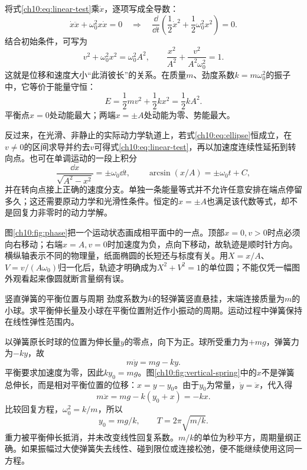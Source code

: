 将式\eqref{ch10:eq:linear-test}乘$\dot x$，逐项写成全导数：
\[
 \dot x\ddot x+\omega_0^2x\dot x=0
 \quad\Longrightarrow\quad
 \frac{\dd}{\dd t}\left(\frac12\dot x^2+\frac12\omega_0^2x^2\right)=0.
\]
结合初始条件，可写为
\begin{equation}\label{ch10:eq:ellipse}
 v^2+\omega_0^2x^2=\omega_0^2A^2,
 \qquad \frac{x^2}{A^2}+\frac{v^2}{A^2\omega_0^2}=1.
\end{equation}
这就是位移和速度大小“此消彼长”的关系。在质量$m$、劲度系数$k=m\omega_0^2$的振子中，它等价于能量守恒：
\begin{equation}\label{ch10:eq:energy}
 E=\frac12mv^2+\frac12kx^2=\frac12kA^2.
\end{equation}
平衡点$x=0$处动能最大；两端$x=\pm A$处动能为零、势能最大。

反过来，在光滑、非静止的实际动力学轨道上，若式\eqref{ch10:eq:ellipse}恒成立，在$v\ne0$的区间求导并约去$v$可得式\eqref{ch10:eq:linear-test}，再以加速度连续性延拓到转向点。也可在单调运动的一段上积分
\[
 \frac{\dd x}{\sqrt{A^2-x^2}}=\pm\omega_0\dd t,
 \qquad \arcsin(x/A)=\pm\omega_0t+C,
\]
并在转向点接上正确的速度分支。单独一条能量等式并不允许任意安排在端点停留多久；这还需要原动力学和光滑性条件。恒定的$x=\pm A$也满足该代数等式，却不是回复力非零时的动力学解。

\chTenPhaseFigure
图\ref{ch10:fig:phase}把一个运动状态画成相平面中的一点。顶部$x=0,v>0$时点必须向右移动；右端$x=A,v=0$时加速度为负，点向下移动，故轨迹是顺时针方向。横纵轴表示不同的物理量，纸面椭圆的长短还与标度有关。用$X=x/A$、$V=v/(A\omega_0)$归一化后，轨迹才明确成为$X^2+V^2=1$的单位圆；不能仅凭一幅图外观看起来像圆就断言量纲有误。

\begin{origexamplebox}{竖直弹簧的平衡位置与周期}\label{ch10:ex:vertical-spring}
劲度系数为$k$的轻弹簧竖直悬挂，末端连接质量为$m$的小球。求平衡伸长量及小球在平衡位置附近作小振动的周期。运动过程中弹簧保持在线性弹性范围内。

\ThQVerticalSpring
\end{origexamplebox}
\begin{xesolution}
以弹簧原长时球的位置为伸长量$y$的零点，向下为正。球所受重力为$+mg$，弹簧力为$-ky$，故
\[
 m\ddot y=mg-ky.
\]
平衡要求加速度为零，因此$ky_0=mg$。图\ref{ch10:fig:vertical-spring}中的$x$不是弹簧总伸长，而是相对平衡位置的位移：$x=y-y_0$。由于$y_0$为常量，$\ddot y=\ddot x$，代入得
\[
 m\ddot x=mg-k(y_0+x)=-kx.
\]
\chTenVerticalFigure
比较回复方程，$\omega_0^2=k/m$，所以
\[
 \boxed{y_0=mg/k},\qquad \boxed{T=2\pi\sqrt{m/k}}.
\]
重力被平衡伸长抵消，并未改变线性回复系数。$m/k$的单位为秒平方，周期量纲正确。如果振幅过大使弹簧失去线性、碰到限位或连接松弛，便不能继续使用这同一方程。
\end{xesolution}

